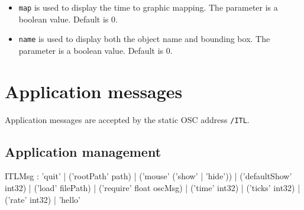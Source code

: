 \documentclass[a4paper,twoside]{report}
\newcommand{\toplevel}[1]	{\chapter{#1}}
\newcommand{\sublevel}[1]	{\section{#1}}
\newcommand{\OSC}[1]		{\texttt{#1}}
\begin{document}
\begin{itemize}
\item \OSC{map} is used to display the time to graphic mapping. The parameter is a boolean value. Default is 0.
\item \OSC{name} is used to display both the object name and bounding box. The parameter is a boolean value. Default is 0.
\end{itemize}


\toplevel{Application messages}
\label{ITL}
Application messages are accepted by the static OSC address \OSC{/ITL}. 


\sublevel{Application management}
\label{applmgmt}

\begin{rail}
ITLMsg : 'quit' 
		| ('rootPath' path) 
		| ('mouse' ('show' | 'hide'))
		| ('defaultShow' int32)
		| ('load' filePath)
		| ('require' float oscMsg)
		| ('time' int32)
		| ('ticks' int32)
		| ('rate' int32)
		| 'hello'
\end{rail}
\end{document}
